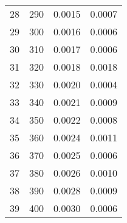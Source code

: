 \begin{table}
\begin{adjustbox}{width=1\textwidth/2}
\begin{tabular}{|c|c|c|c|}
\cline{1-4}
28 & 290 & 0.0015 & 0.0007 \\
\cline{1-4}
29 & 300 & 0.0016 & 0.0006 \\
\cline{1-4}
30 & 310 & 0.0017 & 0.0006 \\
\cline{1-4}
31 & 320 & 0.0018 & 0.0018 \\
\cline{1-4}
32 & 330 & 0.0020 & 0.0004 \\
\cline{1-4}
33 & 340 & 0.0021 & 0.0009 \\
\cline{1-4}
34 & 350 & 0.0022 & 0.0008 \\
\cline{1-4}
35 & 360 & 0.0024 & 0.0011 \\
\cline{1-4}
36 & 370 & 0.0025 & 0.0006 \\
\cline{1-4}
37 & 380 & 0.0026 & 0.0010 \\
\cline{1-4}
38 & 390 & 0.0028 & 0.0009 \\
\cline{1-4}
39 & 400 & 0.0030 & 0.0006 \\
\cline{1-4}
\end{tabular}
\end{adjustbox}
\end{table}

